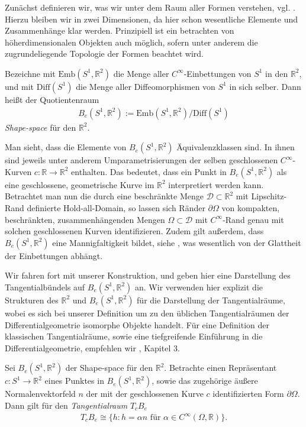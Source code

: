 Zunächst definieren wir, was wir unter dem Raum aller Formen verstehen, vgl. \cite{bfgs1}. Hierzu bleiben wir in zwei Dimensionen, da hier schon wesentliche Elemente und Zusammenhänge klar werden. Prinzipiell ist ein betrachten von höherdimensionalen Objekten auch möglich, sofern unter anderem die zugrundeliegende Topologie der Formen beachtet wird.

\begin{defi}
Bezeichne mit $\text{Emb}(S^1, \mathbb{R}^2)$ die Menge aller $C^\infty$-Einbettungen von $S^1$ in den $\mathbb{R}^2$, und mit $\text{Diff}(S^1)$ die Menge aller Diffeomorphismen von $S^1$ in sich selber. Dann heißt der Quotientenraum
\begin{align*}
	B_e(S^1,\mathbb{R}^2) := \text{Emb}(S^1, \mathbb{R}^2) / \text{Diff}(S^1)
\end{align*}
\textit{Shape-space} für den $\mathbb{R}^2$.
\end{defi}

Man sieht, dass die Elemente von $B_e(S^1,\mathbb{R}^2)$ Äquivalenzklassen sind. In ihnen sind jeweils unter anderem Umparametrisierungen der selben geschlossenen $C^\infty$-Kurven $c: \mathbb{R} \rightarrow \mathbb{R}^2$ enthalten. Das bedeutet, dass ein Punkt in $B_e(S^1,\mathbb{R}^2)$ als eine geschlossene, geometrische Kurve im $\mathbb{R}^2$ interpretiert werden kann. Betrachtet man nun die durch eine beschränkte Menge $\mathcal{D}\subset\mathbb{R}^2$ mit Lipschitz-Rand definierte Hold-all-Domain, so lassen sich Ränder $\partial\Omega$ von kompakten, beschränkten, zusammenhängenden Mengen $\Omega\subset \mathcal{D}$ mit $C^\infty$-Rand genau mit solchen geschlossenen Kurven identifizieren. Zudem gilt außerdem, dass $B_e(S^1,\mathbb{R}^2)$ eine Mannigfaltigkeit bildet, siehe \cite{bfgs2}, was wesentlich von der Glattheit der Einbettungen abhängt.

Wir fahren fort mit unserer Konstruktion, und geben hier eine Darstellung des Tangentialbündels auf $B_e(S^1,\mathbb{R}^2)$ an. Wir verwenden hier explizit die Strukturen des $\mathbb{R}^2$ und $B_e(S^1,\mathbb{R}^2)$ für die Darstellung der Tangentialräume, wobei es sich bei unserer Definition um zu den üblichen Tangentialräumen der Differentialgeometrie isomorphe Objekte handelt. Für eine Definition der klassischen Tangentialräume, sowie eine tiefgreifende Einführung in die Differentialgeometrie, empfehlen wir \cite{LeeDGEO}, Kapitel 3.

\begin{defi}[Tangentialbündel]\label{Tangentialvektor}
Sei $B_e(S^1, \mathbb{R}^2)$ der Shape-space für den $\mathbb{R}^2$. Betrachte einen Repräsentant $c: S^1 \rightarrow \mathbb{R}^2$ eines Punktes in $B_e(S^1, \mathbb{R}^2)$, sowie das zugehörige äußere Normalenvektorfeld $n$ der mit der geschlossenen Kurve $c$ identifizierten Form $\partial\Omega$. Dann gilt für den \textit{Tangentialraum} $T_cB_e$
\begin{align*}
	T_cB_e \cong \{h : h = \alpha n \text{ für } \alpha \in C^\infty(\Omega,\mathbb{R})\}.
\end{align*}

\end{defi}

